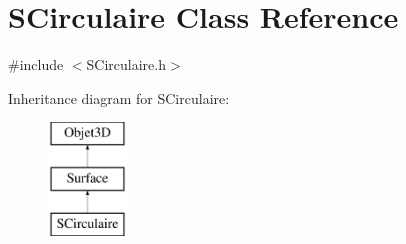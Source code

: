 \hypertarget{classSCirculaire}{\section{S\-Circulaire Class Reference}
\label{classSCirculaire}
}


{\ttfamily \#include $<$S\-Circulaire.\-h$>$}

Inheritance diagram for S\-Circulaire\-:\begin{figure}[H]
\begin{center}
\leavevmode
\includegraphics[height=3.000000cm]{classSCirculaire}
\end{center}
\end{figure}
